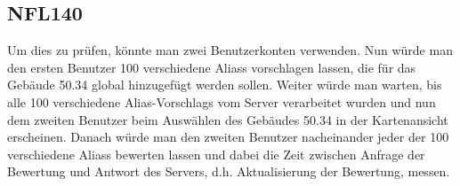 \subsection*{NFL140}
Um dies zu prüfen, könnte man zwei \Gls{Benutzer}konten verwenden. Nun würde man den ersten \Gls{Benutzer} 100 verschiedene \Glspl{Alias} vorschlagen lassen, die für das Gebäude 50.34 \gls{global} hinzugefügt werden sollen. Weiter würde man warten, bis alle 100 verschiedene \Glspl{Alias-Vorschlag} vom \Gls{Server} verarbeitet wurden und nun dem zweiten \Gls{Benutzer} beim Auswählen des Gebäudes 50.34 in der \Gls{Kartenansicht} erscheinen. Danach würde man den zweiten \Gls{Benutzer} nacheinander jeder der 100 verschiedene \Glspl{Alias} bewerten lassen und dabei die Zeit zwischen Anfrage der Bewertung und Antwort des \Gls{Server}s, d.h. Aktualisierung der Bewertung, messen.